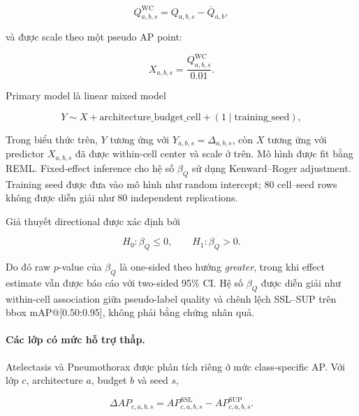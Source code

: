 \documentclass[pdflatex,sn-mathphys-num]{sn-jnl}%
\theoremstyle{thmstyleone}%
\theoremstyle{thmstyletwo}%
\theoremstyle{thmstylethree}%
\begin{document}
\begin{equation}
Q^{\mathrm{WC}}_{a,b,s}
=
Q_{a,b,s}
-
\overline{Q}_{a,b},
\label{eq:qpseudo_within_cell_centering}
\end{equation}

và được scale theo một pseudo AP point:

\begin{equation}
X_{a,b,s}
=
\frac{Q^{\mathrm{WC}}_{a,b,s}}{0.01}.
\label{eq:qpseudo_scaled_predictor}
\end{equation}

Primary model là linear mixed model

\begin{equation}
Y
\sim
X
+
\mathrm{architecture\_budget\_cell}
+
(1\mid\mathrm{training\_seed}),
\label{eq:rq4_primary_mixed_model}
\end{equation}

Trong biểu thức trên, \(Y\) tương ứng với
\(Y_{a,b,s}=\Delta_{a,b,s}\), còn \(X\) tương ứng với predictor
\(X_{a,b,s}\) đã được within-cell center và scale ở trên.
Mô hình được fit bằng REML. Fixed-effect inference cho hệ số
\(\beta_Q\) sử dụng Kenward--Roger adjustment. Training seed được đưa vào
mô hình như random intercept; 80 cell--seed rows không được diễn giải như
80 independent replications.

Giả thuyết directional được xác định bởi

\begin{equation}
H_0:\beta_Q\leq0,
\qquad
H_1:\beta_Q>0.
\label{eq:rq4_beta_hypothesis}
\end{equation}

Do đó raw \(p\)-value của \(\beta_Q\) là one-sided theo hướng
\textit{greater}, trong khi effect estimate vẫn được báo cáo với two-sided
95\% CI. Hệ số \(\beta_Q\) được diễn giải như within-cell association giữa
pseudo-label quality và chênh lệch SSL--SUP trên bbox mAP@[0.50:0.95], không phải bằng chứng nhân
quả.

\paragraph{Các lớp có mức hỗ trợ thấp.}

Atelectasis và Pneumothorax được phân tích riêng ở mức class-specific AP.
Với lớp \(c\), architecture \(a\), budget \(b\) và seed \(s\),

\begin{equation}
\Delta AP_{c,a,b,s}
=
AP^{\mathrm{SSL}}_{c,a,b,s}
-
AP^{\mathrm{SUP}}_{c,a,b,s}.
\label{eq:rare_class_cell_gain}
\end{equation}
\end{document}
